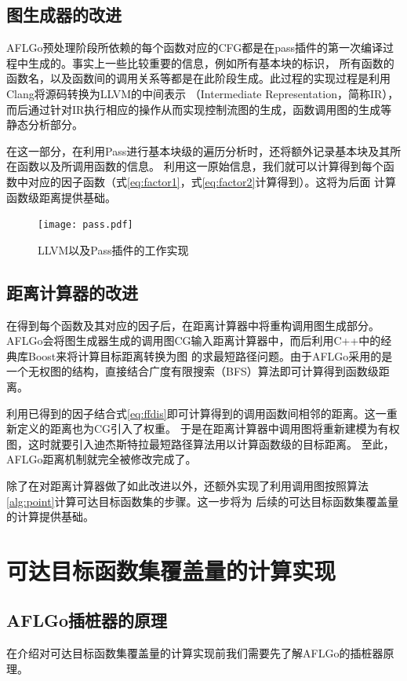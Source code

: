 \documentclass[bachelor]{njupthesis}
\begin{document}
\subsection{图生成器的改进}
AFLGo预处理阶段所依赖的每个函数对应的CFG都是在pass插件的第一次编译过程中生成的。事实上一些比较重要的信息，例如所有基本块的标识，
所有函数的函数名，以及函数间的调用关系等都是在此阶段生成。此过程的实现过程是利用Clang\cite{Clang}将源码转换为LLVM的中间表示
（Intermediate Representation，简称IR），而后通过针对IR执行相应的操作从而实现控制流图的生成，函数调用图的生成等静态分析部分。

在这一部分，在利用Pass进行基本块级的遍历分析时，还将额外记录基本块及其所在函数以及所调用函数的信息。
利用这一原始信息，我们就可以计算得到每个函数中对应的因子函数（式\ref{eq:factor1}，式\ref{eq:factor2}计算得到）。这将为后面
计算函数级距离提供基础。

\begin{figure}[htb]
	\centering
	\texttt{[image: pass.pdf]}
	\caption{LLVM以及Pass插件的工作实现}
 	\label{pic:pass}
\end{figure}


\subsection{距离计算器的改进}
在得到每个函数及其对应的因子后，在距离计算器中将重构调用图生成部分。
AFLGo会将图生成器生成的调用图CG输入距离计算器中，而后利用C++中的经典库Boost\cite{Boost}来将计算目标距离转换为图
的求最短路径问题。由于AFLGo采用的是一个无权图的结构，直接结合广度有限搜索（BFS）算法即可计算得到函数级距离。

利用已得到的因子结合式\ref{eq:ffdis}即可计算得到的调用函数间相邻的距离。这一重新定义的距离也为CG引入了权重。
于是在距离计算器中调用图将重新建模为有权图，这时就要引入迪杰斯特拉最短路径算法用以计算函数级的目标距离。
至此，AFLGo距离机制就完全被修改完成了。

除了在对距离计算器做了如此改进以外，还额外实现了利用调用图按照算法\ref{alg:point}计算可达目标函数集的步骤。这一步将为
后续的可达目标函数集覆盖量的计算提供基础。

\section{可达目标函数集覆盖量的计算实现}
\subsection{AFLGo插桩器的原理}
在介绍对可达目标函数集覆盖量的计算实现前我们需要先了解AFLGo的插桩器原理。
\end{document}
